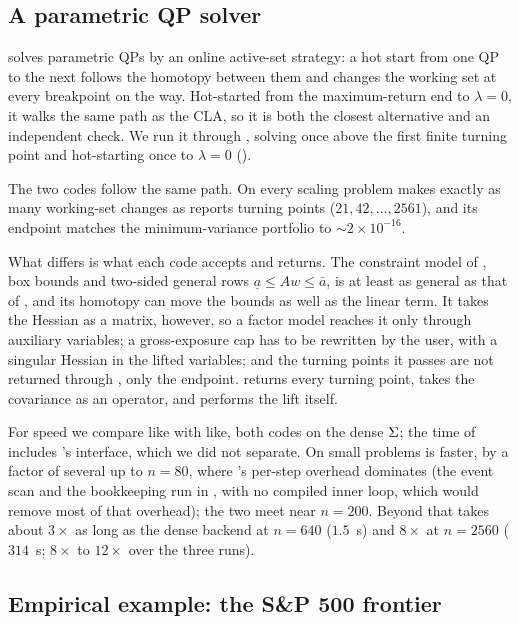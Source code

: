 \subsection{A parametric QP solver}
\label{sec:qpoases}

 \citep{ferreau2014} solves parametric QPs by an online active-set
strategy: a hot start from one QP to the next follows the homotopy between them and
changes the working set at every breakpoint on the way. Hot-started from the
maximum-return end to $\lambda = 0$, it walks the same path as the CLA, so it is both
the closest alternative and an independent check. We run it through 
\citep{andersson2019}, solving once above the first finite turning point and
hot-starting once to $\lambda = 0$ ().

The two codes follow the same path. On every scaling problem  makes exactly
as many working-set changes as  reports turning points ($21, 42, \dots,
2561$), and its endpoint matches the minimum-variance portfolio to
$\sim\!2\times10^{-16}$.

What differs is what each code accepts and returns. The constraint model of
, box bounds and two-sided general rows $\underline{a} \le Aw \le \bar{a}$,
is at least as general as that of , and its homotopy can move the bounds as
well as the linear term. It takes the Hessian as a matrix, however, so a factor model
reaches it only through auxiliary variables; a gross-exposure cap has to be rewritten
by the user, with a singular Hessian in the lifted variables; and the turning points it
passes are not returned through , only the endpoint.  returns
every turning point, takes the covariance as an operator, and performs the lift itself.

For speed we compare like with like, both codes on the dense $\Sigma$; the time of
 includes 's interface, which we did not separate. On small
problems  is faster, by a factor of several up to $n=80$, where
's  per-step overhead dominates (the event scan and the
bookkeeping run in , with no compiled inner loop, which would remove most of
that overhead); the two meet near
$n=200$. Beyond that  takes about $3\times$ as long as the dense backend at
$n=640$ ($1.5$~s) and $8\times$ at $n=2560$ ($314$~s; $8\times$ to $12\times$ over the
three runs).

\subsection[Empirical example: the SP 500 frontier]{Empirical example: the S\&P 500 frontier}
\label{sec:empirical}

